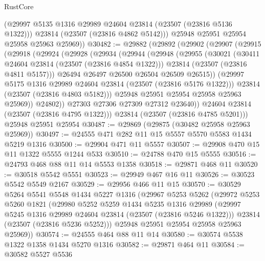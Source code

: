 \begin{lexlean}{RustCore}
\begin{coremodule}
          (@29997 @5135 @1316 @29989 @24604 @23814 (@23507 (@23816 @5136 @1322)))
          @23814
          (@23507 (@23816 @4862 @5142)))
        @25948
        @25951
        @25954
        @25958
        @25963
        @25969))
@30482 := @29882
    (@29892
      (@29902
        (@29907
          (@29915
            (@29918
              (@29924
                (@29928
                  (@29934
                    (@29944
                      (@29948
                        (@29955
                          (@30021
                            (@30411 @24604 @23814 (@23507 (@23816 @4854 @1322)))
                            @23814
                            (@23507 (@23816 @4811 @5157)))
                          @26494
                          @26497
                          @26500
                          @26504
                          @26509
                          @26515))
                      (@29997 @5175 @1316 @29989 @24604 @23814 (@23507 (@23816 @5176 @1322)))
                      @23814
                      (@23507 (@23816 @4803 @5182)))
                    @25948
                    @25951
                    @25954
                    @25958
                    @25963
                    @25969))
                @24802))
            @27303
            @27306
            @27309
            @27312
            @23640))
        @24604
        @23814
        (@23507 (@23816 @4795 @1322)))
      @23814
      (@23507 (@23816 @4785 @5201)))
    @25948
    @25951
    @25954
@30487 := @29869 (@29875 (@30482 @25958 @25963 @25969))
@30497 := @24555 @471 @282 @11 @15 @5557 @5570 @5583 @1434 @5219 @1316
@30500 := @29904 @471 @11 @5557
@30507 := @29908 @470 @15 @11 @1322 @5555 @1244 @533
@30510 := @24788 @470 @15 @5555
@30516 := @24793 @468 @88 @11 @14 @5553 @1358
@30518 := @29871 @468 @11
@30520 := @30518 @5542 @5551
@30523 := @29949 @467 @16 @11
@30526 := @30523 @5542 @5549 @2167
@30529 := @29956 @466 @11 @15
@30570 := @30529
    @5264
    @5541
    @5548
    @1434
    @5227
    @1316
    (@29967
      @5253
      @5262
      (@29972
        @5253
        @5260
        @1821
        (@29980
          @5252
          @5259
          @1434
          @5235
          @1316
          @29989
          (@29997 @5245 @1316 @29989 @24604 @23814 (@23507 (@23816 @5246 @1322)))
          @23814
          (@23507 (@23816 @5236 @5252)))
        @25948
        @25951
        @25954
        @25958
        @25963
        @25969))
@30574 := @24555 @464 @88 @11 @14
@30580 := @30574 @5538 @1322 @1358 @1434 @5270 @1316
@30582 := @29871 @464 @11
@30584 := @30582 @5527 @5536

\end{coremodule}
\end{lexlean}
